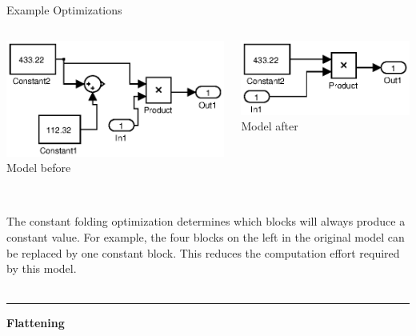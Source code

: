 \documentclass[final,hyperref={pdfpagelabels=false}]{beamer}
\begin{document}
\begin{frame}{}
\begin{columns}[t]
\begin{column}{.585\linewidth}
\begin{block}{Example Optimizations}
\begin{columns}[c]
\begin{column}{.485\linewidth}
\begin{center}
         \includegraphics[width=0.8\linewidth]{images/models/HSimpleConstDead}\\
          \footnotesize Model before
         \end{center}
         \end{column}
         \begin{column}{.485\linewidth}
         \begin{center}
         \includegraphics[width=0.8\linewidth]{images/models/HSimpleConstDead_export}\\
        \footnotesize Model after
         \end{center}
         \end{column}
         \end{columns}
          \footnotesize ~\\
         The constant folding optimization determines which blocks will always produce a constant value. For example, the four blocks on the left in the original model can be replaced by one constant block. This reduces the computation effort required by this model.
          ~\\~\\
         \hrule
          \begin{center}\textbf{Flattening}\end{center}
                 
         \begin{columns}[c]
         \begin{column}{.485\linewidth}
         \begin{center}
         

\end{center}
\end{column}
\end{columns}
\end{block}
\end{column}
\end{columns}
\end{frame}
\end{document}

